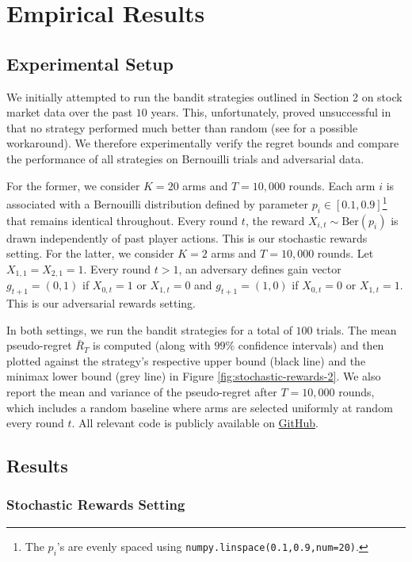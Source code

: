 \documentclass[12pt]{article}
\begin{document}
\section{Empirical Results}

\subsection{Experimental Setup}

We initially attempted to run the bandit strategies outlined in Section 2 on stock market data over the past $10$ years. This, unfortunately, proved unsuccessful in that no strategy performed much better than random (see \cite{shen2015} for a possible workaround). We therefore experimentally verify the regret bounds and compare the performance of all strategies on Bernouilli trials and adversarial data.

For the former, we consider $K=20$ arms and $T=10,000$ rounds. Each arm $i$ is associated with a Bernouilli distribution defined by parameter $p_{i}\in[0.1,0.9]$\footnote{The $p_{i}$'s are evenly spaced using \texttt{numpy.linspace(0.1,0.9,num=20)}.} that remains identical throughout. Every round $t$, the reward $X_{i,t}\sim\text{Ber}(p_{i})$ is drawn independently of past player actions. This is our stochastic rewards setting. For the latter, we consider $K=2$ arms and $T=10,000$ rounds. Let $X_{1,1}=X_{2,1}=1$. Every round $t>1$, an adversary defines gain vector $g_{t+1}=(0,1)$ if $X_{0,t}=1$ or $X_{1,t}=0$ and $g_{t+1}=(1,0)$ if $X_{0,t}=0$ or $X_{1,t}=1$. This is our adversarial rewards setting.

In both settings, we run the bandit strategies for a total of $100$ trials. The mean pseudo-regret $\bar{R}_{T}$ is computed (along with $99\%$ confidence intervals) and then plotted against the strategy's respective upper bound (black line) and the minimax lower bound (grey line) in Figure \ref{fig:stochastic-rewards-2}. We also report the mean and variance of the pseudo-regret after $T=10,000$ rounds, which includes a random baseline where arms are selected uniformly at random every round $t$. All relevant code is publicly available on \href{https://github.com/jiujianxian/COS-511-Project}{GitHub}. 

\subsection{Results}

\subsubsection{Stochastic Rewards Setting}
\end{document}
